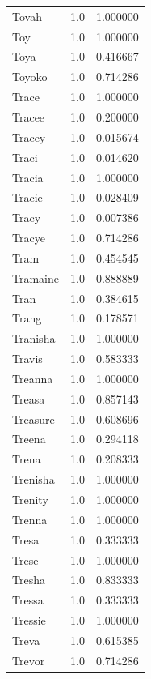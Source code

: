 \documentclass[
  letterpaper,
  DIV=11,
  numbers=noendperiod]{scrreprt}
\begin{document}
\begin{tabular}{lrr}
Tovah           &   1.0 &   1.000000 \\
Toy             &   1.0 &   1.000000 \\
Toya            &   1.0 &   0.416667 \\
Toyoko          &   1.0 &   0.714286 \\
Trace           &   1.0 &   1.000000 \\
Tracee          &   1.0 &   0.200000 \\
Tracey          &   1.0 &   0.015674 \\
Traci           &   1.0 &   0.014620 \\
Tracia          &   1.0 &   1.000000 \\
Tracie          &   1.0 &   0.028409 \\
Tracy           &   1.0 &   0.007386 \\
Tracye          &   1.0 &   0.714286 \\
Tram            &   1.0 &   0.454545 \\
Tramaine        &   1.0 &   0.888889 \\
Tran            &   1.0 &   0.384615 \\
Trang           &   1.0 &   0.178571 \\
Tranisha        &   1.0 &   1.000000 \\
Travis          &   1.0 &   0.583333 \\
Treanna         &   1.0 &   1.000000 \\
Treasa          &   1.0 &   0.857143 \\
Treasure        &   1.0 &   0.608696 \\
Treena          &   1.0 &   0.294118 \\
Trena           &   1.0 &   0.208333 \\
Trenisha        &   1.0 &   1.000000 \\
Trenity         &   1.0 &   1.000000 \\
Trenna          &   1.0 &   1.000000 \\
Tresa           &   1.0 &   0.333333 \\
Trese           &   1.0 &   1.000000 \\
Tresha          &   1.0 &   0.833333 \\
Tressa          &   1.0 &   0.333333 \\
Tressie         &   1.0 &   1.000000 \\
Treva           &   1.0 &   0.615385 \\
Trevor          &   1.0 &   0.714286 \\

\end{tabular}
\end{document}
